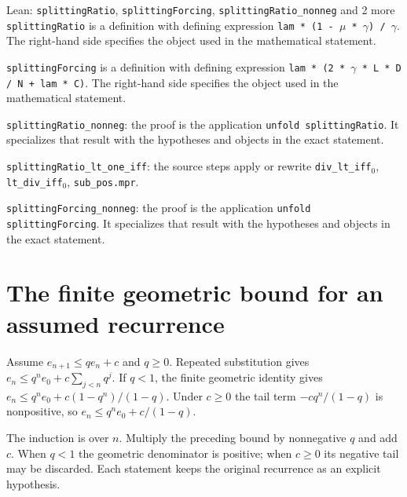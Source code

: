 \documentclass[11pt,a4paper]{article}
\begin{document}
\begin{leanbox}{Lean: \texttt{splittingRatio}, \texttt{splittingForcing}, \texttt{splittingRatio\_\allowbreak{}nonneg} and 2 more}
\texttt{splitting\allowbreak{}Ratio} is a definition with defining expression \texttt{lam * (1 -\allowbreak{} \ensuremath{\mu} * \ensuremath{\gamma}) /\allowbreak{} \ensuremath{\gamma}}. The right-hand side specifies the object used in the mathematical statement.



\texttt{splitting\allowbreak{}Forcing} is a definition with defining expression \texttt{lam * (2 * \ensuremath{\gamma} * L * D /\allowbreak{} N + lam * C)}. The right-hand side specifies the object used in the mathematical statement.



\texttt{splitting\allowbreak{}Ratio\_\allowbreak{}nonneg}: the proof is the application \texttt{unfold splitting\allowbreak{}Ratio}. It specializes that result with the hypotheses and objects in the exact statement.



\texttt{splitting\allowbreak{}Ratio\_\allowbreak{}lt\_\allowbreak{}one\_\allowbreak{}iff}: the source steps apply or rewrite \texttt{div\_\allowbreak{}lt\_\allowbreak{}iff\ensuremath{{}_{0}}}, \texttt{lt\_\allowbreak{}div\_\allowbreak{}iff\ensuremath{{}_{0}}}, \texttt{sub\_\allowbreak{}pos.\allowbreak{}mpr}.



\texttt{splitting\allowbreak{}Forcing\_\allowbreak{}nonneg}: the proof is the application \texttt{unfold splitting\allowbreak{}Forcing}. It specializes that result with the hypotheses and objects in the exact statement.
\end{leanbox}

\section{\texorpdfstring{The finite geometric bound for an assumed recurrence}{The finite geometric bound for an assumed recurrence}}


Assume \(e_{n+1}\le q e_n+c\) and \(q\ge0\). Repeated substitution gives \(e_n\le q^ne_0+c\sum_{j<n}q^j\). If \(q<1\), the finite geometric identity gives \(e_n\le q^ne_0+c(1-q^n)/(1-q)\). Under \(c\ge0\) the tail term \(-cq^n/(1-q)\) is nonpositive, so \(e_n\le q^ne_0+c/(1-q)\).



The induction is over \(n\). Multiply the preceding bound by nonnegative \(q\) and add \(c\). When \(q<1\) the geometric denominator is positive; when \(c\ge0\) its negative tail may be discarded. Each statement keeps the original recurrence as an explicit hypothesis.
\end{document}
